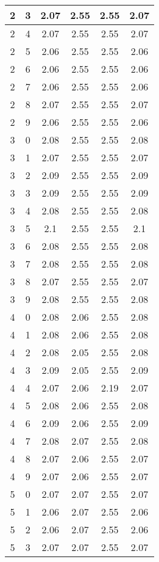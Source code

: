 \begin{longtable}{|c|c||c||c|c||c|}
	2 & 3 & 2.07 & 2.55 & 2.55 & 2.07 \\ \hline
	2 & 4 & 2.07 & 2.55 & 2.55 & 2.07 \\ \hline
	2 & 5 & 2.06 & 2.55 & 2.55 & 2.06 \\ \hline
	2 & 6 & 2.06 & 2.55 & 2.55 & 2.06 \\ \hline
	2 & 7 & 2.06 & 2.55 & 2.55 & 2.06 \\ \hline
	2 & 8 & 2.07 & 2.55 & 2.55 & 2.07 \\ \hline
	2 & 9 & 2.06 & 2.55 & 2.55 & 2.06 \\ \hline
	3 & 0 & 2.08 & 2.55 & 2.55 & 2.08 \\ \hline
	3 & 1 & 2.07 & 2.55 & 2.55 & 2.07 \\ \hline
	3 & 2 & 2.09 & 2.55 & 2.55 & 2.09 \\ \hline
	3 & 3 & 2.09 & 2.55 & 2.55 & 2.09 \\ \hline
	3 & 4 & 2.08 & 2.55 & 2.55 & 2.08 \\ \hline
	3 & 5 & 2.1 & 2.55 & 2.55 & 2.1 \\ \hline
	3 & 6 & 2.08 & 2.55 & 2.55 & 2.08 \\ \hline
	3 & 7 & 2.08 & 2.55 & 2.55 & 2.08 \\ \hline
	3 & 8 & 2.07 & 2.55 & 2.55 & 2.07 \\ \hline
	3 & 9 & 2.08 & 2.55 & 2.55 & 2.08 \\ \hline
	4 & 0 & 2.08 & 2.06 & 2.55 & 2.08 \\ \hline
	4 & 1 & 2.08 & 2.06 & 2.55 & 2.08 \\ \hline
	4 & 2 & 2.08 & 2.05 & 2.55 & 2.08 \\ \hline
	4 & 3 & 2.09 & 2.05 & 2.55 & 2.09 \\ \hline
	4 & 4 & 2.07 & 2.06 & 2.19 & 2.07 \\ \hline
	4 & 5 & 2.08 & 2.06 & 2.55 & 2.08 \\ \hline
	4 & 6 & 2.09 & 2.06 & 2.55 & 2.09 \\ \hline
	4 & 7 & 2.08 & 2.07 & 2.55 & 2.08 \\ \hline
	4 & 8 & 2.07 & 2.06 & 2.55 & 2.07 \\ \hline
	4 & 9 & 2.07 & 2.06 & 2.55 & 2.07 \\ \hline
	5 & 0 & 2.07 & 2.07 & 2.55 & 2.07 \\ \hline
	5 & 1 & 2.06 & 2.07 & 2.55 & 2.06 \\ \hline
	5 & 2 & 2.06 & 2.07 & 2.55 & 2.06 \\ \hline
	5 & 3 & 2.07 & 2.07 & 2.55 & 2.07 \\ \hline

\end{longtable}
